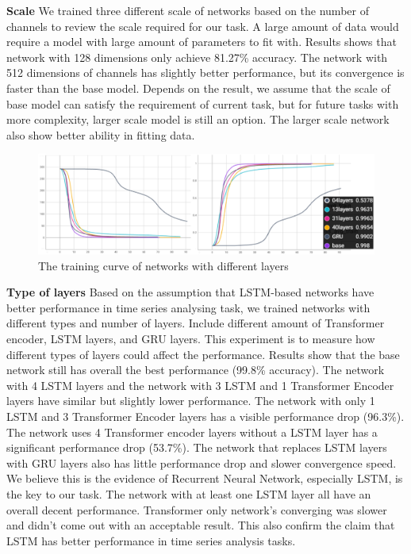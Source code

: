 \noindent\textbf{Scale} \qquad		We trained three different scale of networks based on the number of channels to review the scale required for our task. A large amount of data would require a model with large amount of parameters to fit with. Results shows that network with 128 dimensions only achieve 81.27\% accuracy. The network with 512 dimensions of channels has slightly better performance, but its convergence is faster than the base model. Depends on the result, we assume that the scale of base model can satisfy the requirement of current task, but for future tasks with more complexity, larger scale model is still an option. The larger scale network also show better ability in fitting data.


\begin{figure}[hbt!]
    \centering
    \includegraphics[width=0.9\linewidth]{myReport//figures/layer_curve.png}
    \caption{The training curve of networks with different layers}
    \label{fig:enter-label}
\end{figure}


\noindent\textbf{Type of layers} \qquad		Based on the assumption that LSTM-based networks have better performance in time series analysing task, we trained networks with different types and number of layers. Include different amount of Transformer encoder, LSTM layers, and GRU layers. This experiment is to measure how different types of layers could affect the performance. Results show that the base network still has overall the best performance (99.8\% accuracy). The network with 4 LSTM layers and the network with 3 LSTM and 1 Transformer Encoder layers have similar but slightly lower performance. The network with only 1 LSTM and 3 Transformer Encoder layers has a visible performance drop (96.3\%). The network uses 4 Transformer encoder layers without a LSTM layer has a significant performance drop (53.7\%). The network that replaces LSTM layers with GRU layers also has little performance drop and slower convergence speed. We believe this is the evidence of Recurrent Neural Network, especially LSTM, is the key to our task. The network with at least one LSTM layer all have an overall decent performance. Transformer only network’s converging was slower and didn’t come out with an acceptable result. This also confirm the claim that LSTM has better performance in time series analysis tasks.


